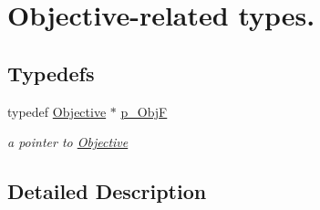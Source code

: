 \hypertarget{group___objective___t_y_p_e_s}{}\section{Objective-\/related types.}
\label{group___objective___t_y_p_e_s}
\subsection*{Typedefs}
\begin{DoxyCompactItemize}
\item 
\mbox{\label{group___objective___t_y_p_e_s_ga24e6a764a1077f62c73a5733e6603755}} 
typedef \mbox{\hyperlink{class_s_m_spp__di__unipi__it_1_1_objective}{Objective}} $\ast$ \mbox{\hyperlink{group___objective___t_y_p_e_s_ga24e6a764a1077f62c73a5733e6603755}{p\+\_\+\+ObjF}}
\begin{DoxyCompactList}\small\item\em a pointer to \mbox{\hyperlink{class_s_m_spp__di__unipi__it_1_1_objective}{Objective}} \end{DoxyCompactList}\end{DoxyCompactItemize}


\subsection{Detailed Description}
